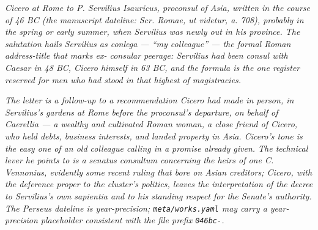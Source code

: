 
\textit{Cicero at Rome to P. Servilius Isauricus, proconsul of
Asia, written in the course of 46 BC (the manuscript dateline:
\textit{Scr. Romae, ut videtur, a. 708}), probably in the spring
or early summer, when Servilius was newly out in his province.
The salutation hails Servilius as \textit{conlega} --- ``my
colleague'' --- the formal Roman address-title that marks ex-
consular peerage: Servilius had been consul with Caesar in 48 BC,
Cicero himself in 63 BC, and the formula is the one register
reserved for men who had stood in that highest of magistracies.}

\textit{The letter is a follow-up to a recommendation Cicero had
made in person, in Servilius's gardens at Rome before the
proconsul's departure, on behalf of Caerellia --- a wealthy and
cultivated Roman woman, a close friend of Cicero, who held debts,
business interests, and landed property in Asia. Cicero's tone is
the easy one of an old colleague calling in a promise already
given. The technical lever he points to is a \textit{senatus
consultum} concerning the heirs of one C. Vennonius, evidently
some recent ruling that bore on Asian creditors; Cicero, with the
deference proper to the cluster's politics, leaves the
interpretation of the decree to Servilius's own \textit{sapientia}
and to his standing respect for the Senate's authority. The
Perseus dateline is year-precision; \texttt{meta/works.yaml} may
carry a year-precision placeholder consistent with the file prefix
\texttt{046bc-}.}
